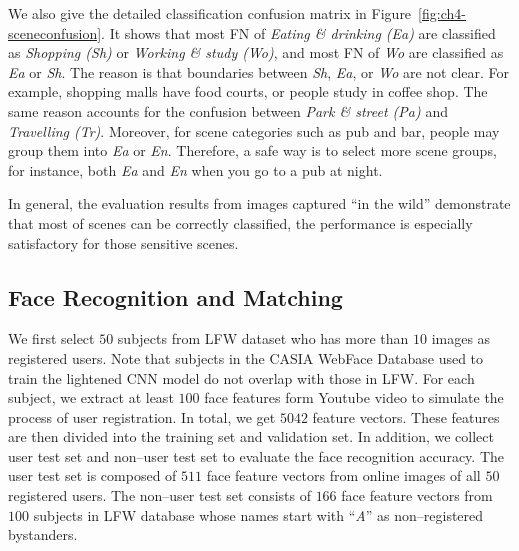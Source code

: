We also give the detailed classification confusion matrix in Figure~\ref{fig:ch4-sceneconfusion}. It shows that most FN of \textit{Eating \& drinking (Ea)} are classified as \textit{Shopping (Sh)} or \textit{Working \& study (Wo)}, and most FN of \textit{Wo} are classified as \textit{Ea} or \textit{Sh}. The reason is that boundaries between \textit{Sh}, \textit{Ea}, or \textit{Wo} are not clear. For example, shopping malls have food courts, or people study in coffee shop. The same reason accounts for the confusion between \textit{Park \& street (Pa)} and \textit{Travelling (Tr)}. Moreover, for scene categories such as pub and bar, people may group them into \textit{Ea} or \textit{En}. Therefore, a safe way is to select more scene groups, for instance, both \textit{Ea} and \textit{En} when you go to a pub at night.

In general, the evaluation results from images captured ``in the wild'' demonstrate that most of scenes can be correctly classified, the performance is especially satisfactory for those sensitive scenes.


\subsection{Face Recognition and Matching}
We first select $50$ subjects from LFW dataset \cite{links:lfw} who has more than $10$ images as registered users. Note that subjects in the CASIA WebFace Database used to train the lightened CNN model do not overlap with those in LFW. For each subject, we extract at least $100$ face features form Youtube video to simulate the process of user registration. In total, we get $5042$ feature vectors. These features are then divided into the training set and validation set. In addition, we collect user test set and non--user test set to evaluate the face recognition accuracy. The user test set is composed of $511$ face feature vectors from online images of all $50$ registered users. The non--user test set consists of $166$ face feature vectors from $100$ subjects in LFW database whose names start with ``\textit{A}'' as non--registered bystanders.


